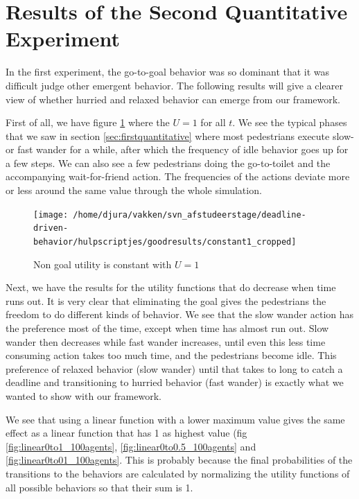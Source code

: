 \documentclass[11pt, a4paper]{book}
\begin{document}
\section{Results of the Second Quantitative Experiment}
\label{sec:secondquantitativeexperimentresults}
In the first experiment, the go-to-goal behavior was so dominant that it was difficult judge other emergent behavior. The following results will give a clearer view of whether hurried and relaxed behavior can emerge from our framework.

First of all, we have figure \ref{fig:constant1} where the $U=1$ for all $t$. We see the typical phases that we saw in section \ref{sec:firstquantitative} where most pedestrians execute slow- or fast wander for a while, after which the frequency of idle behavior goes up for a few steps. We can also see a few pedestrians doing the go-to-toilet and the accompanying wait-for-friend action. The frequencies of the actions deviate more or less around the same value through the whole simulation.

\begin{figure}
\centering
\texttt{[image: /home/djura/vakken/svn\_afstudeerstage/deadline-driven-behavior/hulpscriptjes/goodresults/constant1\_cropped]}
\caption{Non goal utility is constant with $U=1$}
\label{fig:constant1}
\end{figure}

Next, we have the results for the utility functions that do decrease when time runs out. It is very clear that eliminating the goal gives the pedestrians the freedom to do different kinds of behavior. We see that the slow wander action has the preference most of the time, except when time has almost run out. Slow wander then decreases while fast wander increases, until even this less time consuming action takes too much time, and the pedestrians become idle. This preference of relaxed behavior (slow wander) until that takes to long to catch a deadline and transitioning to hurried behavior (fast wander) is exactly what we wanted to show with our framework.

We see that using a linear function with a lower maximum value gives the same effect as a linear function that has 1 as highest value (fig \ref{fig:linear0to1_100agents}, \ref{fig:linear0to0.5_100agents} and \ref{fig:linear0to01_100agents}. This is probably because the final probabilities of the transitions to the behaviors are calculated by normalizing the utility functions of all possible behaviors so that their sum is 1.
\end{document}
